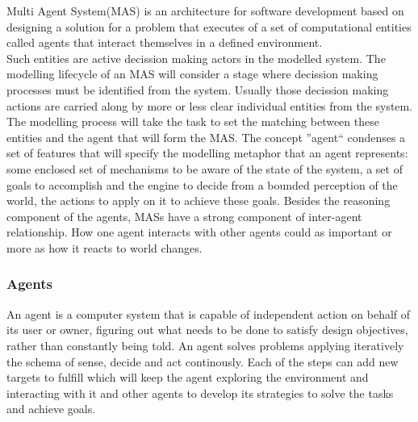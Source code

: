 \documentclass[11pt,oneside,a4paper,openright]{report}
\begin{document}
Multi Agent System(MAS) is an architecture for software development based on designing a solution for a problem that 
executes of a set of computational entities called agents that interact themselves in a defined environment\cite[chapter.1]{Wooldridge2002}.\\
Such entities are active decission making actors in the modelled system. The modelling lifecycle of an MAS will consider a stage where decission making processes must be identified from the system. Usually those decission making actions are carried along by more or less clear individual entities from the system. The modelling process will take the task to set the matching between these entities and the agent that will form the MAS. The concept ''agent`` condenses a set of features that will specify the modelling metaphor that an agent represents:
some enclosed set of mechanisms to be aware of the state of the system, a set of goals to accomplish and the engine to decide from a bounded perception of the world, the actions to apply on it to achieve these goals. Besides the reasoning component of the agents, MASs have a strong component of inter-agent relationship. How one agent interacts with other agents could as important or more as how it reacts to world changes.


\subsubsection{Agents}




An agent is a computer system that is capable of independent action on behalf of its user or owner,
figuring out what needs to be done to satisfy design objectives, rather than constantly being told.\cite[ch.1]{Wooldridge2002} An agent solves problems applying iteratively the schema of sense, decide and 
act continously. Each of the steps can add new targets to fulfill which will keep the agent exploring 
the environment and interacting with it and other agents to develop its strategies to solve the tasks 
and achieve goals.\\
\end{document}
